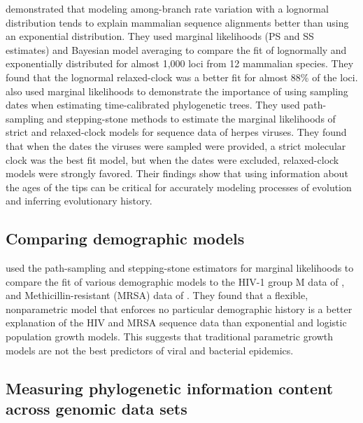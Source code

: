 \citet{Baele2013MBE} demonstrated that modeling
among-branch rate variation with a lognormal distribution tends to explain
mammalian sequence alignments better than using an exponential distribution.
They used marginal likelihoods (PS and SS estimates) and Bayesian model
averaging to compare the fit of lognormally and exponentially distributed
 for almost 1,000 loci from 12
mammalian species.
They found that the lognormal relaxed-clock was a better fit for almost 88\% of
the loci.
\citet{Baele2012} also used marginal likelihoods to
demonstrate the importance of using sampling dates when estimating
time-calibrated phylogenetic trees.
They used path-sampling and stepping-stone methods to estimate the marginal
likelihoods of strict and relaxed-clock models for sequence data of herpes
viruses.
They found that when the dates the viruses were sampled were provided, a strict
molecular clock was the best fit model, but when the dates were excluded,
relaxed-clock models were strongly favored.
Their findings show that using information about the ages of the tips can be
critical for accurately modeling processes of evolution and inferring
evolutionary history.


\subsection{Comparing demographic models}

\citet{Baele2012} used the path-sampling and stepping-stone
estimators for marginal likelihoods to compare the fit of various demographic
models to the HIV-1 group M data of \citet{Worobey2008},
and Methicillin-resistant  (MRSA)  data of \citet{Gray2011}.
They found that a flexible, nonparametric model that enforces no particular
demographic history is a better explanation of the HIV and MRSA sequence data
than exponential and logistic population growth models.
This suggests that traditional parametric growth models are not the best
predictors of viral and bacterial epidemics.



\subsection{Measuring phylogenetic information content across genomic data
    sets}

